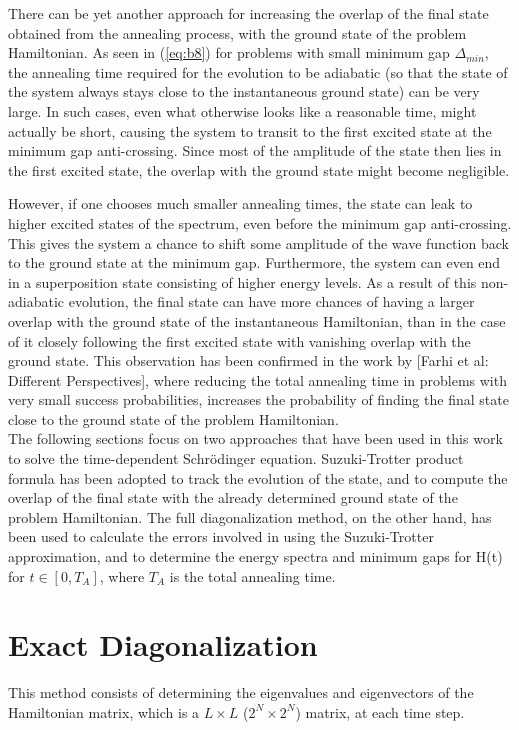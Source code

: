 \documentclass[../main.tex]{subfiles}
\begin{document}
There can be yet another approach for increasing the overlap of the final state obtained from the annealing process, with the ground state of the problem Hamiltonian. As seen in (\ref{eq:b8}) for problems with small minimum gap $\Delta_{min}$, the annealing time required for the evolution to be adiabatic (so that the state of the system always stays close to the instantaneous ground state) can be very large. In such cases, even what otherwise looks like a reasonable time, might actually be short, causing the system to transit to the first excited state at the minimum gap anti-crossing. Since most of the amplitude of the state then lies in the first excited state, the overlap with the ground state might become negligible. 

However, if one chooses much smaller annealing times, the state can leak to higher excited states of the spectrum, even before the minimum gap anti-crossing. This gives the system a chance to shift some amplitude of the wave function back to the ground state at the minimum gap. Furthermore, the system can even end in a superposition state consisting of higher energy levels. As a result of this non-adiabatic evolution, the final state can have more chances of having a larger overlap with the ground state of the instantaneous Hamiltonian, than in the case of it closely following the first excited state with vanishing overlap with the ground state. This observation has been confirmed in the work by [Farhi et al: Different Perspectives], where reducing the total annealing time in problems with very small success probabilities, increases the probability of finding the final state close to the ground state of the problem Hamiltonian.\\

The following sections focus on two approaches that have been used in this work to solve the time-dependent Schr{\"o}dinger equation. Suzuki-Trotter product formula has been adopted to track the evolution of the state, and to compute the overlap of the final state with the already determined ground state of the problem Hamiltonian. The full diagonalization method, on the other hand, has been used to calculate the errors involved in using the Suzuki-Trotter approximation, and to determine the energy spectra and minimum gaps for H(t) for $t \in [0,T_A]$, where $T_A$ is the total annealing time.

\section{Exact Diagonalization}
This method consists of determining the eigenvalues and eigenvectors of the Hamiltonian matrix, which is a $L\times L$ ($2^N \times 2^N$) matrix, at each time step.
\end{document}
